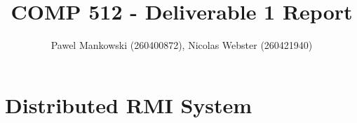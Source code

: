 \documentclass[11pt]{amsart}
\title{COMP 512 - Deliverable 1 Report}
\author{Pawel Mankowski (260400872), Nicolas Webster (260421940)}
\begin{document}
\maketitle

\section{Distributed RMI System}
\end{document}
